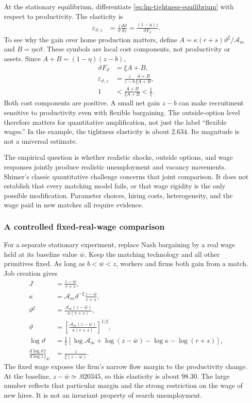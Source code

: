 At the stationary equilibrium, differentiate
\eqref{eq:lm-tightness-equilibrium} with respect to productivity. The
elasticity is
\begin{align}
 \varepsilon_{\vartheta,z}
 &=\frac z\vartheta\frac{d\vartheta}{dz}
   =\frac{(1-\eta)z}{\vartheta F_\vartheta}.
\end{align}
To see why the gain over home production matters, define
$A=\kappa(r+s)\vartheta^\xi/\mathcal A_m$ and
$B=\eta\kappa\vartheta$. These symbols are local cost components, not
productivity or assets. Since $A+B=(1-\eta)(z-b)$,
\begin{align}
 \vartheta F_\vartheta&=\xi A+B,\\
 \varepsilon_{\vartheta,z}
 &=\frac z{z-b}\frac{A+B}{\xi A+B},\\
 1&<\frac{A+B}{\xi A+B}<\frac1\xi.
\end{align}
Both cost components are positive. A small net gain $z-b$ can make recruitment
sensitive to productivity even with flexible bargaining. The outside-option
level therefore matters for quantitative amplification, not just the label
``flexible wages.'' In the example, the tightness elasticity is about $2.634$.
Its magnitude is not a universal estimate.

The empirical question is whether realistic shocks, outside options, and wage
responses jointly produce realistic unemployment and vacancy movements. Shimer's
classic quantitative challenge concerns that joint comparison. It does not
establish that every matching model fails, or that wage rigidity is the only
possible modification. Parameter choices, hiring costs, heterogeneity, and
the wage paid in new matches all require evidence.

\subsubsection{A controlled fixed-real-wage comparison}

For a separate stationary experiment, replace Nash bargaining by a real wage
held at its baseline value $\bar w$. Keep the matching technology and all
other primitives fixed. As long as $b<\bar w<z$, workers and firms both gain
from a match. Job creation gives
\begin{align}
 J&=\frac{z-\bar w}{r+s},\\
 \kappa&=\mathcal A_m\vartheta^{-\xi}\frac{z-\bar w}{r+s},\\
 \vartheta^\xi&=\frac{\mathcal A_m(z-\bar w)}{\kappa(r+s)},\\
 \vartheta&=\left[\frac{\mathcal A_m(z-\bar w)}{\kappa(r+s)}\right]^{1/\xi},\\
 \log\vartheta&=\frac1\xi[\log\mathcal A_m+\log(z-\bar w)
                       -\log\kappa-\log(r+s)],\\
 \left.\frac{d\log\vartheta}{d\log z}\right|_{\bar w}
 &=\frac z{\xi(z-\bar w)}.
\end{align}
The fixed wage exposes the firm's narrow flow margin to the productivity
change. At the baseline, $z-\bar w\simeq.020345$, so this elasticity is about
$98.30$. The large number reflects that particular margin and the strong
restriction on the wage of new hires. It is not an invariant property of
search unemployment.

